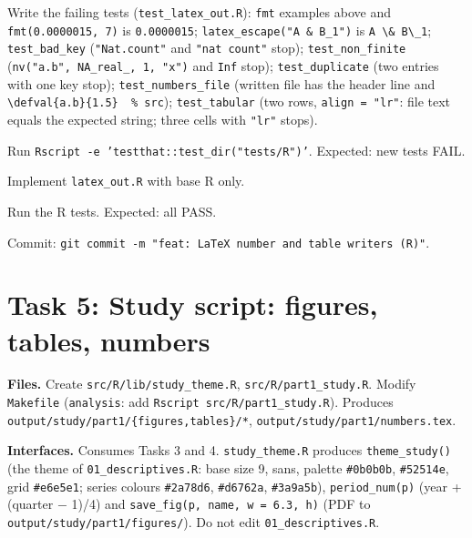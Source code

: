 \documentclass[10pt,a4paper]{article}
\newcommand{\f}[1]{\texttt{#1}}
\begin{document}
\begin{steps}
\item Write the failing tests (\f{test\_latex\_out.R}): \f{fmt} examples above and \f{fmt(0.0000015, 7)} is \f{0.0000015};
      \f{latex\_escape("A \& B\_1")} is \verb|A \& B\_1|; \f{test\_bad\_key} (\f{"Nat.count"} and
      \f{"nat count"} stop); \f{test\_non\_finite} (\f{nv("a.b", NA\_real\_, 1, "x")} and \f{Inf} stop);
      \f{test\_duplicate} (two entries with one key stop); \f{test\_numbers\_file} (written file has the
      header line and \verb|\defval{a.b}{1.5}  % src|); \f{test\_tabular} (two rows, \f{align = "lr"}: file
      text equals the expected string; three cells with \f{"lr"} stops).
\item Run \f{Rscript -e 'testthat::test\_dir("tests/R")'}. Expected: new tests FAIL.
\item Implement \f{latex\_out.R} with base R only.
\item Run the R tests. Expected: all PASS.
\item Commit: \f{git commit -m "feat: LaTeX number and table writers (R)"}.
\end{steps}

\section{Task 5: Study script: figures, tables, numbers}
\textbf{Files.} Create \f{src/R/lib/study\_theme.R}, \f{src/R/part1\_study.R}. Modify \f{Makefile}
(\f{analysis}: add \f{Rscript src/R/part1\_study.R}). Produces \f{output/study/part1/\{figures,tables\}/*},
\f{output/study/part1/numbers.tex}.

\textbf{Interfaces.} Consumes Tasks 3 and 4. \f{study\_theme.R} produces \f{theme\_study()} (the theme of
\f{01\_descriptives.R}: base size 9, sans, palette \f{\#0b0b0b}, \f{\#52514e}, grid \f{\#e6e5e1}; series colours
\f{\#2a78d6}, \f{\#d6762a}, \f{\#3a9a5b}), \f{period\_num(p)} (year + (quarter $-$ 1)/4) and
\f{save\_fig(p, name, w = 6.3, h)} (PDF to \f{output/study/part1/figures/}). Do not edit
\f{01\_descriptives.R}.
\end{document}
